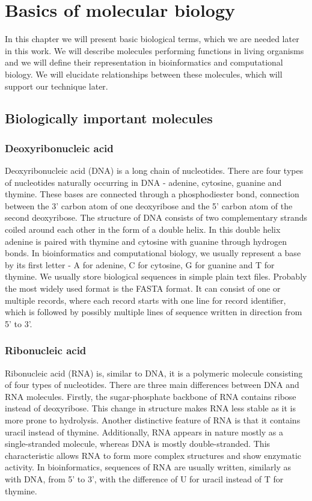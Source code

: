 \chapter{Basics of molecular biology}
In this chapter we will present basic biological terms, which we are needed later in this work.
We will describe molecules performing functions in living organisms and we will define their representation in bioinformatics and computational biology.
We will elucidate relationships between these molecules, which will support our technique later.

\section{Biologically important molecules}

\subsection{Deoxyribonucleic acid}
Deoxyribonucleic acid (DNA) is a long chain of nucleotides.
There are four types of nucleotides naturally occurring in DNA - adenine, cytosine, guanine and thymine.
These bases are connected through a phosphodiester bond, connection between the 3' carbon atom of one deoxyribose and the 5' carbon atom of the second deoxyribose.
The structure of DNA consists of two complementary strands coiled around each other in the form of a double helix.
In this double helix adenine is paired with thymine and cytosine with guanine through hydrogen bonds.
In bioinformatics and computational biology, we usually represent a base by its first letter - A for adenine, C for cytosine, G for guanine and T for thymine.
We usually store biological sequences in simple plain text files.
Probably the most widely used format is the FASTA format.
It can consist of one or multiple records, where each record starts with one line for record identifier, which is followed by possibly multiple lines of sequence written in direction from 5' to 3'.

\subsection{Ribonucleic acid}
Ribonucleic acid (RNA) is, similar to DNA, it is a polymeric molecule consisting of four types of nucleotides.
There are three main differences between DNA and RNA molecules.
Firstly, the sugar-phosphate backbone of RNA contains ribose instead of deoxyribose.
This change in structure makes RNA less stable as it is more prone to hydrolysis.
Another distinctive feature of RNA is that it contains uracil instead of thymine.
Additionally, RNA appears in nature mostly as a single-stranded molecule, whereas DNA is mostly double-stranded.
This characteristic allows RNA to form more complex structures and show enzymatic activity.
In bioinformatics, sequences of RNA are usually written, similarly as with DNA, from 5' to 3', with the difference of U for uracil instead of T for thymine.


